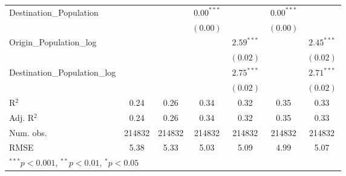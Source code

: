 \begin{table}
\begin{center}
\begin{tabular}{l c c c c c c }
			Destination\_Population      &               &               & $0.00^{***}$  &                & $0.00^{***}$  &                \\
			&               &               & $(0.00)$      &                & $(0.00)$      &                \\
			Origin\_Population\_log      &               &               &               & $2.59^{***}$   &               & $2.45^{***}$   \\
			&               &               &               & $(0.02)$       &               & $(0.02)$       \\
			Destination\_Population\_log &               &               &               & $2.75^{***}$   &               & $2.71^{***}$   \\
			&               &               &               & $(0.02)$       &               & $(0.02)$       \\
			\hline
			R$^2$                        & 0.24          & 0.26          & 0.34          & 0.32           & 0.35          & 0.33           \\
			Adj. R$^2$                   & 0.24          & 0.26          & 0.34          & 0.32           & 0.35          & 0.33           \\
			Num. obs.                    & 214832        & 214832        & 214832        & 214832         & 214832        & 214832         \\
			RMSE                         & 5.38          & 5.33          & 5.03          & 5.09           & 4.99          & 5.07           \\
			\hline
			\multicolumn{7}{l}{\scriptsize{$^{***}p<0.001$, $^{**}p<0.01$, $^*p<0.05$}}
		\end{tabular}
		\label{table:GravityModel2015Q3}
	\end{center}
\end{table}


